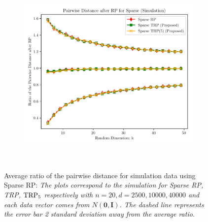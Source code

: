\begin{figure}[ht!]
\begin{subfigure}{0.32\textwidth}
		\includegraphics[scale = 0.3]{figure/dist_sp0_d40000.pdf}
	\end{subfigure}\\
	\caption{Average ratio of the pairwise distance for simulation data using Sparse RP: \textit{The  plots correspond to the simulation for Sparse RP, TRP, $\textup{TRP}_5$ respectively with $n = 20, d = 2500, 10000, 40000$ and each data vector comes from $N(\mathbf{0}, \mathbf{I})$. The dashed line represents the error bar 2 standard deviation away from the average ratio.}} 
	\label{fig:sparse}
\end{figure}

